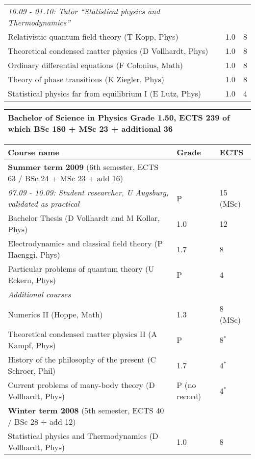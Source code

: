 {\begin{longtable}[t]{p{\widthA} p{\widthB} p{\widthC}}
\textit{10.09 - 01.10: Tutor ``Statistical physics and Thermodynamics''}\\
Relativistic quantum field theory (T Kopp, Phys)
& 1.0
& 8\\
Theoretical condensed matter physics (D Vollhardt, Phys)
& 1.0
& 8\\
Ordinary differential equations (F Colonius, Math)
& 1.0
& 8\\
Theory of phase transitions (K Ziegler, Phys)
& 1.0
& 8\\
Statistical physics far from equilibrium I (E Lutz, Phys)
& 1.0
& 4\\
\hline \hline
\end{longtable}

\noindent \begin{longtable}[t]{p{}}
\textbf{\normalsize{Bachelor of Science in Physics}}
Grade 1.50, ECTS 239 of which BSc 180 + MSc 23 + additional 36
\\ \hline \hline
\end{longtable}
\vspace{-2em}\noindent \begin{longtable}[t]{p{\widthA} p{\widthB} p{\widthC}}
Course name
& Grade
& ECTS \\ \hline
\textbf{Summer term 2009} (6th semester, ECTS 63 / BSc 24 + MSc 23 + add 16) \\
\textit{07.09 - 10.09: Student researcher, U Augsburg, validated as practical }
& P
& 15 (MSc)\\
Bachelor Thesis (D Vollhardt and M Kollar, Phys)
& 1.0
& 12\\
Electrodynamics and classical field theory (P Haenggi, Phys)
& 1.7
& 8\\
Particular problems of quantum theory (U Eckern, Phys)
& P
& 4\\
\textit{Additional courses}\\
Numerics II (Hoppe, Math)
& 1.3
& 8 (MSc)\\
Theoretical condensed matter physics II (A Kampf, Phys)
& P
& 8$^*$\\
History of the philosophy of the present (C Schroer, Phil)
& 1.7
& 4$^*$\\ 
Current problems of many-body theory (D Vollhardt, Phys)
& P (no record)
& 4$^*$\\
\hline
\textbf{Winter term 2008} (5th semester, ECTS 40 / BSc 28 + add 12)\\
Statistical physics and Thermodynamics (D Vollhardt, Phys)
& 1.0
& 8\\

\end{longtable}}

